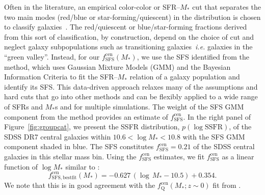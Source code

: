 \documentclass[12pt, letterpaper, preprint, tighten]{aastex62}
\newcommand{\beq}{\begin{equation}}
\newcommand{\eeq}{\end{equation}}
\begin{document}
Often in the literature, an empirical color-color or SFR--$M_*$ cut
that separates the two main modes (red/blue or star-forming/quiescent)
in the distribution is chosen to classify
galaxies~\citep[\emph{e.g.}][]{baldry2006, blanton2009, drory2009, peng2010, moustakas2013, hahn2015}.
The red/quiescent or blue/star-forming fractions derived from this sort
of classification, by construction, depend on the choice of cut and
neglect galaxy subpopulations such as transitioning galaxies~\emph{i.e.}
galaxies in the ``green valley''. Instead, for our $f^\mathrm{cen}_\mathrm{SFS}(M_*)$,
we use the SFS identified from the \cite{hahn2018a} method, which uses Gaussian
Mixture Models (GMM) and the Bayesian Information Criteria to fit the
SFR--$M_*$ relation of a galaxy population and identify its SFS. This
data-driven approach relaxes many of the assumptions and hard cuts that
go into other methods and can be flexibly applied to a wide range of SFRs 
and $M_*$s and for multiple
simulations. The weight of the SFS GMM component from the method provides
an estimate of $f^\mathrm{cen}_\mathrm{SFS}$. In the right panel of
Figure~\ref{fig:groupcat}, we present the SSFR distribution, $p(\log \mathrm{SSFR})$,
of the SDSS DR7 central galaxies within $10.6 < \log M_* < 10.8$ with
the SFS GMM component shaded in blue.
The SFS constitutes $f^\mathrm{cen}_\mathrm{SFS} = 0.21$ of the SDSS
central galaxies in this stellar mass bin. Using the $f^\mathrm{cen}_\mathrm{SFS}$
estimates, we fit $f^\mathrm{cen}_\mathrm{SFS}$ as a linear function of
$\log M_*$ similar to \cite{wetzel2013,hahn2017b}:
\beq \label{eq:f_cen_sfms}
f^\mathrm{cen}_\mathrm{SFS, bestfit}(M_*) = -0.627\,(\log\,M_* - 10.5) + 0.354.
\eeq
We note that this is in good agreement with the $f_\mathrm{Q}^\mathrm{cen}(M_*; z \sim 0)$
fit from \cite{hahn2017b}.
\end{document}
